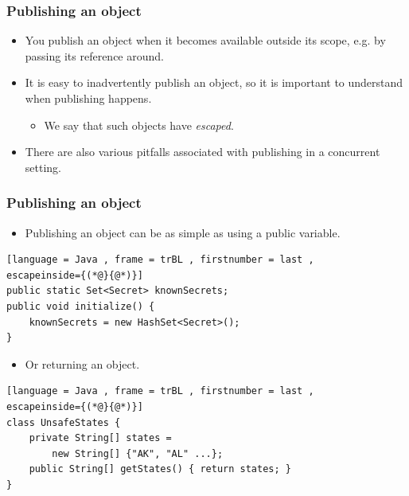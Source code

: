 \documentclass[xcolor={dvipsnames,svgnames},aspectratio=169]{beamer}
\begin{document}
\begin{frame}[fragile]
  \frametitle{Publishing an object}

  \begin{itemize}
  \item[\faBook]<1-> You publish an object when it becomes available outside
    its scope, e.g. by passing its reference around.
  \item[\faBook]<1-> It is easy to inadvertently publish an object, so it is
    important to understand when publishing happens.
    \begin{itemize}
    \item[\faBook]<2-> We say that such objects have \emph{escaped}.
    \end{itemize}
  \item[\faUserInjured]<1-> There are also various pitfalls associated with
    publishing in a concurrent setting.
  \end{itemize}
\end{frame}

\begin{frame}[fragile]
  \frametitle{Publishing an object}

  \begin{itemize}
  \item[\faBook]<1-> Publishing an object can be as simple as using a public variable.
  \end{itemize}
\begin{lstlisting}[language = Java , frame = trBL , firstnumber = last ,
escapeinside={(*@}{@*)}]
public static Set<Secret> knownSecrets;
public void initialize() {
    knownSecrets = new HashSet<Secret>();
}
\end{lstlisting}
  \pause
  \begin{itemize}
  \item[\faBook]<1-> Or returning an object.
  \end{itemize}
\begin{lstlisting}[language = Java , frame = trBL , firstnumber = last ,
escapeinside={(*@}{@*)}]
class UnsafeStates {
    private String[] states =
        new String[] {"AK", "AL" ...};
    public String[] getStates() { return states; }
}
\end{lstlisting}
\end{frame}
\end{document}
